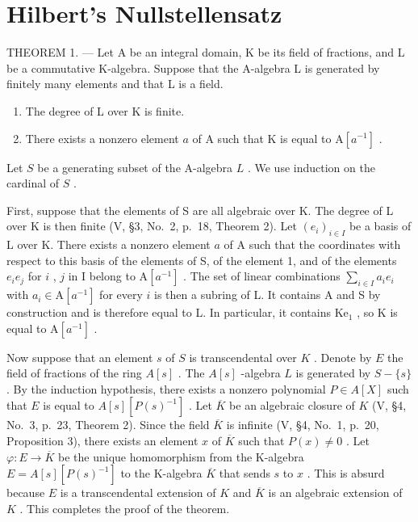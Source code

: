 \chapter{Hilbert's Nullstellensatz}

THEOREM 1. --- Let A be an integral domain, K be its field of fractions, and L be a commutative K-algebra. Suppose that the A-algebra L is generated by finitely many elements and that L is a field.

\begin{enumerate}
\def\labelenumi{\alph{enumi})}
\item
  The degree of L over K is finite.
\item
  There exists a nonzero element \(a\) of \(\mathrm{A}\) such that \(\mathrm{K}\) is equal to \(\mathrm{A}[a^{-1}]\) .
\end{enumerate}

Let \(S\) be a generating subset of the A-algebra \(L\) . We use induction on the cardinal of \(S\) .

First, suppose that the elements of S are all algebraic over K. The degree of L over K is then finite (V, §3, No.~2, p.~18, Theorem 2). Let \((e_i)_{i\in I}\) be a basis of L over K. There exists a nonzero element \(a\) of A such that the coordinates with respect to this basis of the elements of S, of the element 1, and of the elements \(e_i e_j\) for \(i\) , \(j\) in I belong to \(\mathrm{A}[a^{-1}]\) . The set of linear combinations \(\sum_{i\in I}a_i e_i\) with \(a_i\in \mathrm{A}[a^{-1}]\) for every \(i\) is then a subring of L. It contains A and S by construction and is therefore equal to L. In particular, it contains \(\mathrm{Ke}_1\) , so K is equal to \(\mathrm{A}[a^{-1}]\) .

Now suppose that an element \(s\) of \(S\) is transcendental over \(K\) . Denote by \(E\) the field of fractions of the ring \(A[s]\) . The \(A[s]\) -algebra \(L\) is generated by \(S - \{s\}\) . By the induction hypothesis, there exists a nonzero polynomial \(P \in A[X]\) such that \(E\) is equal to \(A[s][P(s)^{-1}]\) . Let \(\overline{K}\) be an algebraic closure of \(K\) (V, §4, No.~3, p.~23, Theorem 2). Since the field \(\overline{K}\) is infinite (V, §4, No.~1, p.~20, Proposition 3), there exists an element \(x\) of \(\overline{K}\) such that \(P(x) \neq 0\) . Let \(\varphi : E \to \overline{K}\) be the unique homomorphism from the K-algebra \(E = A[s][P(s)^{-1}]\) to the K-algebra \(\overline{K}\) that sends \(s\) to \(x\) . This is absurd because \(E\) is a transcendental extension of \(K\) and \(\overline{K}\) is an algebraic extension of \(K\) . This completes the proof of the theorem.

